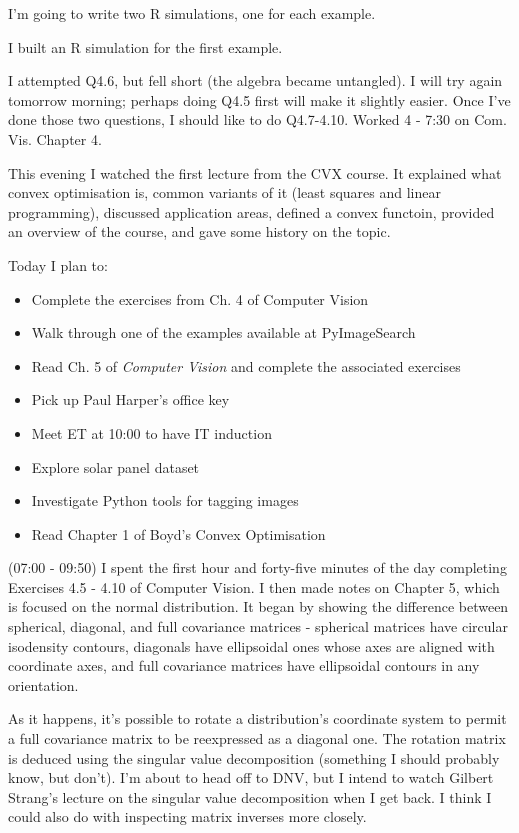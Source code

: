 \documentclass[idxtotoc,hyperref,openany]{labbook} %
\begin{document}
I'm going to write two R simulations, one for each example.

I built an R simulation for the first example.

I attempted Q4.6, but fell short (the algebra became untangled). I will try again tomorrow morning; perhaps doing Q4.5 first will make it slightly easier. Once I've done those two questions, I should like to do Q4.7-4.10.
Worked 4 - 7:30 on Com. Vis. Chapter 4.

This evening I watched the first lecture from the CVX course. It explained what convex optimisation is, common variants of it (least squares and linear programming), discussed application areas, defined a convex functoin, provided an overview of the course, and gave some history on the topic.




Today I plan to:
\begin{itemize}
	\item Complete the exercises from Ch. 4 of Computer Vision
	\item Walk through one of the examples available at PyImageSearch
	\item Read Ch. 5 of \emph{Computer Vision} and complete the associated exercises
	\item Pick up Paul Harper's office key
	\item Meet ET at 10:00 to have IT induction
	\item Explore solar panel dataset
	\item Investigate Python tools for tagging images
	\item Read Chapter 1 of Boyd's Convex Optimisation
\end{itemize}

(07:00 - 09:50) 
I spent the first hour and forty-five minutes of the day completing Exercises 4.5 - 4.10 of Computer Vision. I then made notes on Chapter 5, which is focused on the normal distribution. It began by showing the difference between spherical, diagonal, and full covariance matrices - spherical matrices have circular isodensity contours, diagonals have ellipsoidal ones whose axes are aligned with coordinate axes, and full covariance matrices have ellipsoidal contours in any orientation.

As it happens, it's possible to rotate a distribution's coordinate system to permit a full covariance matrix to be reexpressed as a diagonal one. The rotation matrix is deduced using the singular value decomposition (something I should probably know, but don't). I'm about to head off to DNV, but I intend to watch Gilbert Strang's lecture on the singular value decomposition when I get back. I think I could also do with inspecting matrix inverses more closely.
\end{document}
